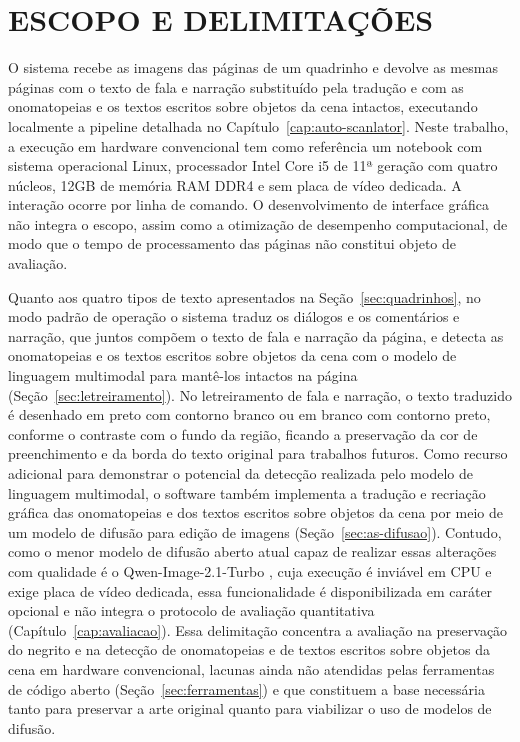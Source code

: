 \documentclass[
    12pt,
    openright,
    oneside,
    a4paper,
    chapter=TITLE,
    section=TITLE,
    english,
    brazilian,
    brazil
]{abntex2}
\begin{document}
\section{ESCOPO E DELIMITAÇÕES}
\label{sec:escopo}

O sistema recebe as imagens das páginas de um quadrinho e devolve as mesmas páginas com o texto de fala e narração substituído pela tradução e com as onomatopeias e os textos escritos sobre objetos da cena intactos, executando localmente a pipeline detalhada no Capítulo~\ref{cap:auto-scanlator}. Neste trabalho, a execução em hardware convencional tem como referência um notebook com sistema operacional Linux, processador Intel Core i5 de 11ª geração com quatro núcleos, 12GB de memória RAM DDR4 e sem placa de vídeo dedicada. A interação ocorre por linha de comando. O desenvolvimento de interface gráfica não integra o escopo, assim como a otimização de desempenho computacional, de modo que o tempo de processamento das páginas não constitui objeto de avaliação.

Quanto aos quatro tipos de texto apresentados na Seção~\ref{sec:quadrinhos}, no modo padrão de operação o sistema traduz os diálogos e os comentários e narração, que juntos compõem o texto de fala e narração da página, e detecta as onomatopeias e os textos escritos sobre objetos da cena com o modelo de linguagem multimodal para mantê-los intactos na página (Seção~\ref{sec:letreiramento}). No letreiramento de fala e narração, o texto traduzido é desenhado em preto com contorno branco ou em branco com contorno preto, conforme o contraste com o fundo da região, ficando a preservação da cor de preenchimento e da borda do texto original para trabalhos futuros. Como recurso adicional para demonstrar o potencial da detecção realizada pelo modelo de linguagem multimodal, o software também implementa a tradução e recriação gráfica das onomatopeias e dos textos escritos sobre objetos da cena por meio de um modelo de difusão para edição de imagens (Seção~\ref{sec:as-difusao}). Contudo, como o menor modelo de difusão aberto atual capaz de realizar essas alterações com qualidade é o Qwen-Image-2.1-Turbo \cite{qwenimage21turbo}, cuja execução é inviável em CPU e exige placa de vídeo dedicada, essa funcionalidade é disponibilizada em caráter opcional e não integra o protocolo de avaliação quantitativa (Capítulo~\ref{cap:avaliacao}). Essa delimitação concentra a avaliação na preservação do negrito e na detecção de onomatopeias e de textos escritos sobre objetos da cena em hardware convencional, lacunas ainda não atendidas pelas ferramentas de código aberto (Seção~\ref{sec:ferramentas}) e que constituem a base necessária tanto para preservar a arte original quanto para viabilizar o uso de modelos de difusão.
\end{document}
